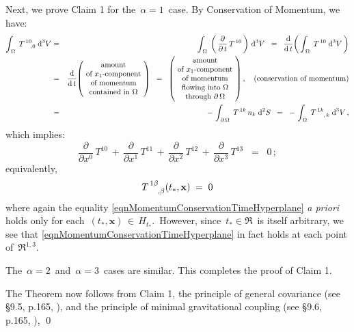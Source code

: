 \vskip 0.2cm
\noindent
Next, we prove Claim 1 for the \,$\alpha = 1$\, case.
By {\color{red}Conservation of Momentum}, we have:
\begin{eqnarray*}
\int_{\,\Omega}\;T^{\,10}_{\,{\color{white}10},0}\;\d^{3}V
& = &
	\int_{\,\Omega}\;\left(\,\dfrac{\partial}{\partial\,t}\,T^{\,10}\,\right)\,\d^{3}V
\;\; = \;\;
	\dfrac{\d}{\d\,t}\!\left(\,\int_{\,\Omega}\;T^{\,10}\;\d^{3}V\,\right)
\\
&=&
\dfrac{\d}{\d\,t}\!\left(\!\begin{array}{c}
	\textnormal{amount}
	\\
	\textnormal{of $x_{1}$-component}
	\\
	\textnormal{of momentum}
	\\
	\textnormal{contained in $\Omega$}
	\end{array}\!\right)
\;\; = \;\;
	\left(\!\begin{array}{c}
		\textnormal{amount}
		\\
		\textnormal{of $x_{1}$-component}
		\\
		\textnormal{of momentum}
		\\
		\textnormal{flowing into $\Omega$}
		\\
		\textnormal{through $\partial\,\Omega$}
		\end{array}\!\right),
	\quad
	\textnormal{(conservation of momentum)}
\\
&=&
	-\,\int_{\,\partial\,\Omega}\;T^{\,1k}\,n_{k}\;\d^{2}S
\;\; = \;\;
	-\,\int_{\,\Omega}\;T^{\,1k}_{\;{\color{white}0k},\,k}\;\d^{3}V\,,
\end{eqnarray*}
which implies:
\begin{equation*}
\dfrac{\partial}{\partial x^{0}}\,T^{10}
\,+\,
\dfrac{\partial}{\partial x^{1}}\,T^{11}
\,+\,
\dfrac{\partial}{\partial x^{2}}\,T^{12}
\,+\,
\dfrac{\partial}{\partial x^{3}}\,T^{13}
\;\; = \;\;
0\,;
\end{equation*}
equivalently,
\begin{equation}\label{eqnMomentumConservationTimeHyperplane}
T^{\,1\beta}_{\;{\color{white}0\beta},\beta}(t_{*},\mathbf{x}) \; = \; 0
\end{equation}
where again the equality \eqref{eqnMomentumConservationTimeHyperplane}
\textit{a priori} holds only for each \,$(t_{*},\mathbf{x}) \,\in\, H_{t_{*}}$.\,
However, since \,$t_{*} \in \Re$\, is itself arbitrary, we see that 
\eqref{eqnMomentumConservationTimeHyperplane} in fact holds at each point of \,$\Re^{1,3}$.\,

\vskip 0.2cm
\noindent
The \,$\alpha = 2$\, and \,$\alpha = 3$\, cases are similar.
This completes the proof of Claim 1.

\vskip 0.3cm
\noindent
The Theorem now follows from Claim 1,
the {\color{red}principle of general covariance} (see \S9.5, p.165, \cite{dInverno2021}),
and the {\color{red}principle of minimal gravitational coupling} (see \S9.6, p.165, \cite{dInverno2021}),
\qed



